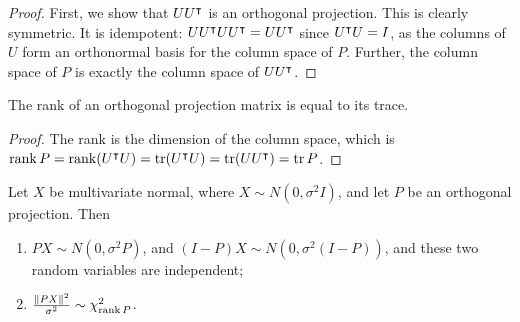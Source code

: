 \begin{proof}
	First, we show that \( UU^\intercal \) is an orthogonal projection.
	This is clearly symmetric.
	It is idempotent: \( U U^\intercal U U^\intercal = U U^\intercal \) since \( U^\intercal U = I \), as the columns of \( U \) form an orthonormal basis for the column space of \( P \).
	Further, the column space of \( P \) is exactly the column space of \( U U^\intercal \).
\end{proof}
\begin{proposition}
	The rank of an orthogonal projection matrix is equal to its trace.
\end{proposition}
\begin{proof}
	The rank is the dimension of the column space, which is \( \rank P = \rank(U^\intercal U) = \tr(U^\intercal U) = \tr(U U^\intercal) = \tr P \).
\end{proof}
\begin{theorem}
	Let \( X \) be multivariate normal, where \( X \sim N(0,\sigma^2 I) \), and let \( P \) be an orthogonal projection.
	Then
	\begin{enumerate}
		\item \( PX \sim N(0,\sigma^2 P) \), and \( (I-P)X \sim N(0,\sigma^2(I-P)) \), and these two random variables are independent;
		\item \( \frac{\norm{PX}^2}{\sigma^2} \sim \chi^2_{\rank P} \).
	\end{enumerate}
\end{theorem}
